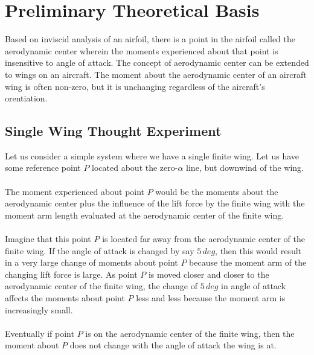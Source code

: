 
\section{Preliminary Theoretical Basis}
\begin{comment}
\end{comment}
Based on inviscid analysis of an airfoil, there is a point in the airfoil called the aerodynamic center wherein the moments experienced about that point is insensitive to angle of attack.
The concept of aerodynamic center can be extended to wings on an aircraft.
The moment about the aerodynamic center of an aircraft wing is often non-zero, but it is unchanging regardless of the aircraft's orentiation.

\subsection{Single Wing Thought Experiment}
\begin{comment}
\end{comment}
Let us consider a simple system where we have a single finite wing. 
Let us have some reference point $P$ located about the zero-$\alpha$ line, but downwind of the wing.
\\~\\The moment experienced about point $P$ would be the moments about the aerodynamic center plus the influence of the lift force by the finite wing with the moment arm length evaluated at the aerodynamic center of the finite wing.
\\~\\Imagine that this point $P$ is located far away from the aerodynamic center of the finite wing.
If the angle of attack is changed by say $5\,deg$, then this would result in a very large change of moments about point $P$ because the moment arm of the changing lift force is large.
As point $P$ is moved closer and closer to the aerodynamic center of the finite wing, the change of $5\,deg$ in angle of attack affects the moments about point $P$ less and less because the moment arm is increasingly small.
\\~\\Eventually if point $P$ is on the aerodynamic center of the finite wing, then the moment about $P$ does not change with the angle of attack the wing is at.


